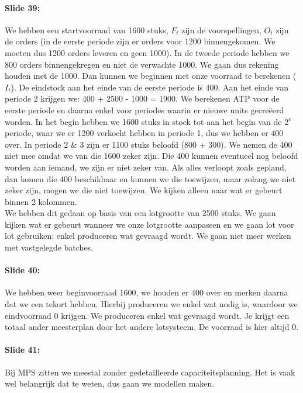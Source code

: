 \documentclass[10pt,a4paper]{report}
\begin{document}
\paragraph{Slide 39:} We hebben een startvoorraad van 1600 stuks, $F_{t}$ zijn de voorspellingen, $O_{t}$ zijn de orders (in de eerste periode zijn er orders voor 1200 binnengekomen. We moeten dus 1200 orders leveren en geen 1000). In de tweede periode hebben we 800 orders binnengekregen en niet de verwachte 1000. We gaan dus rekening houden met de 1000. Dan kunnen we beginnen met onze voorraad te berekenen ($I_{t}$). De eindstock aan het einde van de eerste periode is 400. Aan het einde van periode 2 krijgen we: 400 + 2500 - 1000 = 1900. We berekenen ATP voor de eerste periode en daarna enkel voor periodes waarin er nieuwe units gecre\"eerd worden. In het begin hebben we 1600 stuks in stock tot aan het begin van de $2^{e}$ periode, waar we er 1200 verkocht hebben in periode 1, dus we hebben er 400 over. In periode 2 $\&$ 3 zijn er 1100 stuks beloofd (800 + 300). We nemen de 400 niet mee omdat we van die 1600 zeker zijn. Die 400 kunnen eventueel nog beloofd worden aan iemand, we zijn er niet zeker van. Als alles verloopt zoals gepland, dan komen die 400 beschikbaar en kunnen we die toewijzen, maar zolang we niet zeker zijn, mogen we die niet toewijzen. We kijken alleen naar wat er gebeurt binnen 2 kolommen.\\
We hebben dit gedaan op basis van een lotgrootte van 2500 stuks. We gaan kijken wat er gebeurt wanneer we onze lotgrootte aanpassen en we gaan lot voor lot gebruiken: enkel produceren wat gevraagd wordt. We gaan niet meer werken met vastgelegde batches.

\paragraph{Slide 40:} We hebben weer beginvoorraad 1600, we houden er 400 over en merken daarna dat we een tekort hebben. Hierbij produceren we enkel wat nodig is, waardoor we eindvoorraad 0 krijgen. We produceren enkel wat gevraagd wordt. Je krijgt een totaal ander meesterplan door het andere lotsysteem. De voorraad is hier altijd 0.

\paragraph{Slide 41:} Bij MPS zitten we meestal zonder gedetailleerde capaciteitsplanning. Het is vaak wel belangrijk dat te weten, dus gaan we modellen maken.
\end{document}
